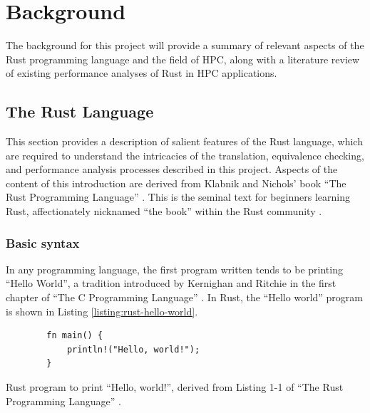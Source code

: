 \chapter{Background}
\label{ch:background}


The background for this project will provide a summary of relevant aspects of the Rust programming language and the field of \acrshort{HPC}, along with a literature review of existing performance analyses of Rust in \acrshort{HPC} applications.


\section{The Rust Language}
\label{sec:rust}

This section provides a description of salient features of the Rust language, which are required to understand the intricacies of the translation, equivalence checking, and performance analysis processes described in this project. Aspects of the content of this introduction are derived from Klabnik and Nichols' book ``The Rust Programming Language'' \cite{RustProgrammingLanguage}. This is the seminal text for beginners learning Rust, affectionately nicknamed ``the book'' within the Rust community \cite{LearnRust}.

\subsection{Basic syntax}
\label{ssec:rust-syntax}

In any programming language, the first program written tends to be printing ``Hello World'', a tradition introduced by Kernighan and Ritchie in the first chapter of ``The C Programming Language'' \cite{kernighan2002c}. In Rust, the ``Hello world'' program is shown in Listing \ref{listing:rust-hello-world}.

\begin{code}
    \begin{verbatim}
        fn main() {
            println!("Hello, world!");
        }
    \end{verbatim}
    \caption{Rust program to print ``Hello, world!'', derived from Listing 1-1 of ``The Rust Programming Language'' \cite{RustProgrammingLanguage}.}
    \label{listing:rust-hello-world}
\end{code}

